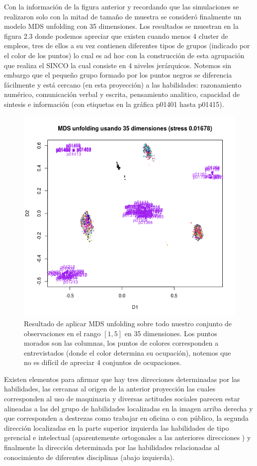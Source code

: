 \documentclass[paper=letter, fontsize=11pt]{scrartcl}
\numberwithin{equation}{section} %
\numberwithin{figure}{section} %
\numberwithin{table}{section} %
\begin{document}
Con la información de la figura anterior y recordando que las simulaciones se realizaron solo con la mitad de tamaño de muestra se consideró finalmente un modelo MDS unfolding con 35 dimensiones. Los resultados se muestran en la figura 2.3 donde podemos apreciar que existen cuando menos 4 cluster de empleos, tres de ellos a su vez contienen diferentes tipos de grupos (indicado por el color de los puntos) lo cual es ad hoc con la construcción de esta agrupación que realiza el SINCO la cual consiste en 4 niveles jerárquicos. Notemos sin embargo que el pequeño grupo formado por los puntos negros se diferencia fácilmente y está cercano (en esta proyección) a las habilidades: razonamiento numérico, comunicación verbal y escrita, pensamiento analitico, capacidad de sintesis e información (con etiquetas en la gráfica p01401 hasta p01415).    
\begin{figure}[H]
  \begin{center}
    \includegraphics[scale=0.75]{35dimensiones.png}
    \caption{Resultado de aplicar MDS unfolding sobre todo nuestro conjunto de observaciones en el rango $[1,5]$ en 35 dimensiones. Los puntos morados son las columnas, los puntos de colores corresponden a entrevistados (donde el color determina su ocupación), notemos que no es difícil de apreciar 4 conjuntos de ocupaciones.}
    \label{figura2_3}
  \end{center}
\end{figure}
Existen elementos para afirmar que hay tres direcciones determinadas por las habilidades, las cercanas al origen de la anterior proyección las cuales corresponden al uso de maquinaria y diversas actitudes sociales parecen estar alineadas a las del grupo de habilidades localizadas en la imagen arriba derecha y que corresponden a destrezas como trabajar en oficina o con público, la segunda dirección localizadas en la parte superior izquierda las habilidades de tipo gerencial e intelectual (aparentemente ortogonales a las anteriores direcciones
) y finalmente la dirección determinada por las habilidades relacionadas al conocimiento de diferentes disciplinas (abajo izquierda).\\
\end{document}
